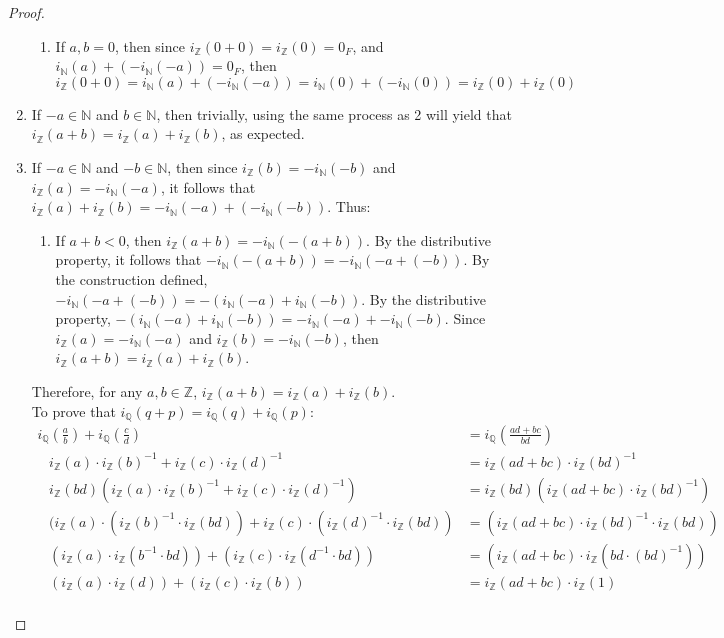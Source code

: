 \documentclass[openany, amssymb, psamsfonts]{amsart}
\newcommand{\bbN}{\mathbb{N}}
\newcommand{\bbQ}{\mathbb{Q}}
\newcommand{\bbZ}{\mathbb{Z}}
\theoremstyle{definition}
\numberwithin{equation}{section}
\begin{document}
\begin{proof}
\begin{enumerate}
\begin{enumerate}
        \item If $a,b= 0$, then since $i_\bbZ(0+0) = i_\bbZ(0)=0_F$, and $i_\bbN(a) + (-i_\bbN(-a)) = 0_F$, then $i_\bbZ(0+0) = i_\bbN(a) + (-i_\bbN(-a)) = i_\bbN(0) + (-i_\bbN(0))=i_\bbZ(0) + i_\bbZ(0)$
    \end{enumerate}
    \item If $-a\in \bbN$ and $b\in \bbN$, then trivially, using the same process as 2 will yield that $i_\bbZ(a+b) = i_\bbZ(a) +i_\bbZ(b)$, as expected.
    \item If $-a\in \bbN$ and $-b\in \bbN$, then since $i_\bbZ(b) = -i_\bbN(-b)$ and $i_\bbZ(a) = -i_\bbN(-a)$, it follows that $i_\bbZ(a) + i_\bbZ(b) = -i_\bbN(-a) + (-i_\bbN(-b))$. Thus:
    \begin{enumerate}
        \item If $a+b <0$, then $i_\bbZ(a+b) = -i_\bbN(-(a+b))$. By the distributive property, it follows that $-i_\bbN(-(a+b)) = -i_\bbN(-a+(-b))$. By the construction defined, $-i_\bbN(-a+(-b)) = -(i_\bbN(-a) + i_\bbN(-b))$. By the distributive property, $-(i_\bbN(-a) + i_\bbN(-b)) = -i_\bbN(-a) + -i_\bbN(-b)$. Since $i_\bbZ(a) = -i_\bbN(-a)$ and $i_\bbZ(b) = -i_\bbN(-b)$, then $i_\bbZ(a+b) = i_\bbZ(a) + i_\bbZ(b)$.
    \end{enumerate}
Therefore, for any $a,b\in \bbZ$, $i_\bbZ(a+b) = i_\bbZ(a) + i_\bbZ(b)$.\\
To prove that $i_\bbQ(q+p) = i_\bbQ(q) + i_\bbQ(p)$:
\begin{align*}
    \tag{WTS:} i_\bbQ(\frac{a}{b}) + i_\bbQ(\frac{c}{d}) &= i_\bbQ(\frac{ad+bc}{bd})\\
    \tag{By Construction:}\;\;\; i_\bbZ(a) \cdot i_\bbZ(b)^{-1} + i_\bbZ(c) \cdot i_\bbZ(d)^{-1} &= i_\bbZ(ad+bc)\cdot i_\bbZ(bd)^{-1}\\
    \tag{Multiplicative Inv:}\;\;\; i_\bbZ(bd)(i_\bbZ(a) \cdot i_\bbZ(b)^{-1} + i_\bbZ(c) \cdot i_\bbZ(d)^{-1}) &= i_\bbZ(bd)(i_\bbZ(ad+bc)\cdot i_\bbZ(bd)^{-1})\\
    \tag{Comm. and Dist:}\;\;\; (i_\bbZ(a) \cdot (i_\bbZ(b)^{-1} \cdot i_\bbZ(bd)) + i_\bbZ(c) \cdot (i_\bbZ(d)^{-1}\cdot i_\bbZ(bd)) &= (i_\bbZ(ad+bc)\cdot i_\bbZ(bd)^{-1} \cdot i_\bbZ(bd))\\
    \tag{By Construction}\;\;\;(i_\bbZ(a) \cdot i_\bbZ(b^{-1}\cdot bd)) + (i_\bbZ(c) \cdot i_\bbZ(d^{-1}\cdot bd)) &= (i_\bbZ(ad+bc)\cdot i_\bbZ(bd\cdot (bd)^{-1}))\\
    \tag{By Inverses}\;\;\; (i_\bbZ(a) \cdot i_\bbZ(d)) + (i_\bbZ(c) \cdot i_\bbZ(b)) &= i_\bbZ(ad+bc)\cdot i_\bbZ(1)\\

\end{align*}
\end{enumerate}
\end{proof}
\end{document}
